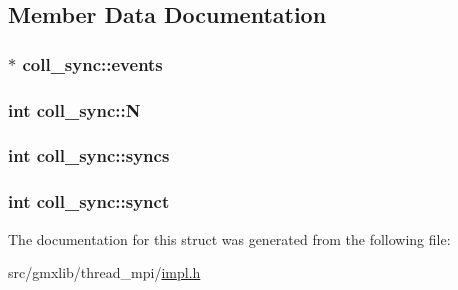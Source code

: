 \subsection{\-Member \-Data \-Documentation}
\hypertarget{structcoll__sync_addd34cb5edca74913057c39b621a445a}{
\subsubsection[{events}]{$\ast$ {\bf coll\-\_\-sync\-::events}}}\label{structcoll__sync_addd34cb5edca74913057c39b621a445a}
\hypertarget{structcoll__sync_af946c30424e3f6b054469696ae9084d2}{
\subsubsection[{\-N}]{\setlength{\rightskip}{0pt plus 5cm}int {\bf coll\-\_\-sync\-::\-N}}}\label{structcoll__sync_af946c30424e3f6b054469696ae9084d2}
\hypertarget{structcoll__sync_a4dc1f14b8600d9fbd4e66a91edfd45d3}{
\subsubsection[{syncs}]{\setlength{\rightskip}{0pt plus 5cm}int {\bf coll\-\_\-sync\-::syncs}}}\label{structcoll__sync_a4dc1f14b8600d9fbd4e66a91edfd45d3}
\hypertarget{structcoll__sync_aa84d891d8fca6bae54a1d5261c045709}{
\subsubsection[{synct}]{\setlength{\rightskip}{0pt plus 5cm}int {\bf coll\-\_\-sync\-::synct}}}\label{structcoll__sync_aa84d891d8fca6bae54a1d5261c045709}


\-The documentation for this struct was generated from the following file\-:\begin{DoxyCompactItemize}
\item 
src/gmxlib/thread\-\_\-mpi/\hyperlink{impl_8h}{impl.\-h}\end{DoxyCompactItemize}
